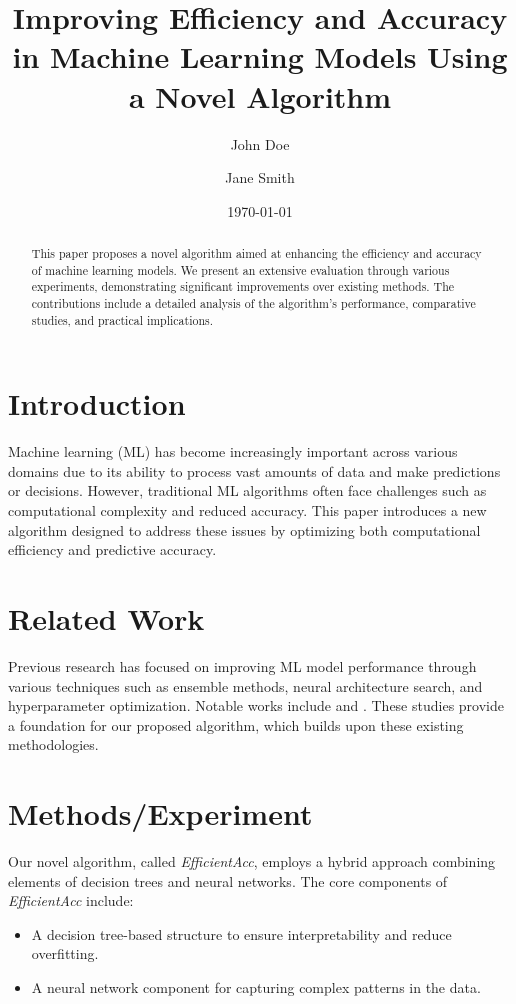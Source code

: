 \documentclass{article}
\title{Improving Efficiency and Accuracy in Machine Learning Models Using a Novel Algorithm}
\author{John Doe \and Jane Smith}
\date{\today}
\begin{document}
\maketitle

\begin{abstract}
This paper proposes a novel algorithm aimed at enhancing the efficiency and accuracy of machine learning models. We present an extensive evaluation through various experiments, demonstrating significant improvements over existing methods. The contributions include a detailed analysis of the algorithm's performance, comparative studies, and practical implications.
\end{abstract}

\section{Introduction}
Machine learning (ML) has become increasingly important across various domains due to its ability to process vast amounts of data and make predictions or decisions. However, traditional ML algorithms often face challenges such as computational complexity and reduced accuracy. This paper introduces a new algorithm designed to address these issues by optimizing both computational efficiency and predictive accuracy.

\section{Related Work}
Previous research has focused on improving ML model performance through various techniques such as ensemble methods, neural architecture search, and hyperparameter optimization. Notable works include \cite{zhang2018survey} and \cite{li2019neural}. These studies provide a foundation for our proposed algorithm, which builds upon these existing methodologies.

\section{Methods/Experiment}
Our novel algorithm, called \textit{EfficientAcc}, employs a hybrid approach combining elements of decision trees and neural networks. The core components of \textit{EfficientAcc} include:
\begin{itemize}
    \item A decision tree-based structure to ensure interpretability and reduce overfitting.
    \item A neural network component for capturing complex patterns in the data.
\end{itemize}
\end{document}
